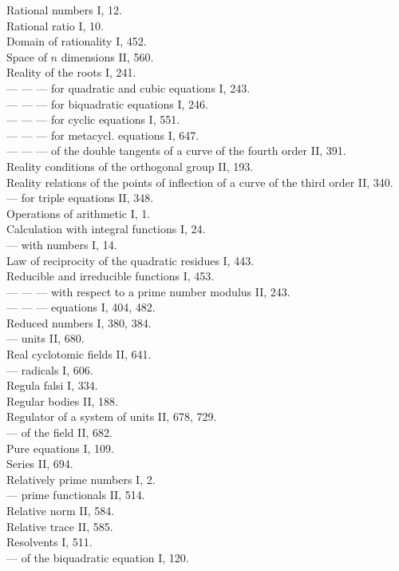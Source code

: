 
\noindent
Rational numbers I, 12.\\
Rational ratio I, 10.\\
Domain of rationality I, 452.\\
Space of $n$ dimensions II, 560.\\
Reality of the roots I, 241.\\
--- --- --- for quadratic and cubic equations I, 243.\\
--- --- --- for biquadratic equations I, 246.\\
--- --- --- for cyclic equations I, 551.\\
--- --- --- for metacycl. equations I, 647.\\
--- --- --- of the double tangents of a curve of the fourth order II, 391.\\
Reality conditions of the orthogonal group II, 193.\\
Reality relations of the points of inflection of a curve of the third order II, 340.\\
--- for triple equations II, 348.\\
Operations of arithmetic I, 1.\\
Calculation with integral functions I, 24.\\
--- with numbers I, 14.\\
Law of reciprocity of the quadratic residues I, 443.\\
Reducible and irreducible functions I, 453.\\
--- --- --- with respect to a prime number modulus II, 243.\\
--- --- --- equations I, 404, 482.\\
Reduced numbers I, 380, 384.\\
--- units II, 680.\\
Real cyclotomic fields II, 641.\\
--- radicals I, 606.\\
Regula falsi I, 334.\\
Regular bodies II, 188.\\
Regulator of a system of units II, 678, 729.\\
--- of the field II, 682.\\
Pure equations I, 109.\\
Series II, 694.\\
Relatively prime numbers I, 2.\\
--- prime functionals II, 514.\\
Relative norm II, 584.\\
Relative trace II, 585.\\
Resolvents I, 511.\\
--- of the biquadratic equation I, 120.


